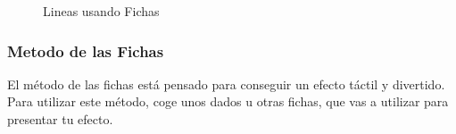 \documentclass[a4paper,twocolumn,openany,10pt]{dndbook}
\begin{document}
\begin{figure}[htp]
	\centering

	\caption{Lineas usando Fichas}
	\label{img:token_linea}
\end{figure}
 
\subsubsection{Metodo de las Fichas}
El método de las fichas está pensado para conseguir un efecto táctil y divertido. Para utilizar este método, coge unos dados u
otras fichas, que vas a utilizar para presentar tu efecto.
\end{document}
